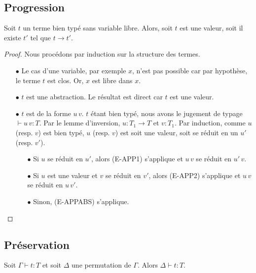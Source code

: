 \subsection*{Progression}

\begin{theorem} 
  \label{thm:simply-typed-lambda-calculus-progression}
  Soit $t$ un terme bien typé sans variable libre. Alors, soit $t$ est une
  valeur, soit il existe $t'$ tel que $t \rightarrow t'$.
\end{theorem}

\begin{proof}
  \label{proof:simply-typed-lambda-calculus-progression}
  Nous procédons par induction sur la structure des termes.
  \begin{itemize}
    \item[$\bullet$] Le cas d'une variable, par exemple $x$, n'est pas possible car par
      hypothèse, le terme $t$ est clos. Or, $x$ est libre dans $x$.
    \item[$\bullet$] $t$ est une abstraction. Le résultat est direct car $t$ est une valeur.
    \item[$\bullet$] $t$ est de la forme $u \, v$. $t$ étant
      bien typé, nous avons le jugement de typage $\vdash u \, v : T$. Par le lemme
      d'inversion, $u : T_{1} \rightarrow T$ et $v : T_{1}$. Par induction,
      comme $u$ (resp. $v$) est bien typé, $u$ (resp. $v$) est soit une valeur,
      soit se réduit en un $u'$ (resp. $v'$).
      \begin{itemize}
        \item[$\bullet$] Si $u$ se réduit en $u'$, alors (E-APP1) s'applique et $u \, v$
          se réduit en $u' \, v$.
        \item[$\bullet$] Si $u$ est une valeur et $v$ se réduit en $v'$, alors (E-APP2)
          s'applique et $u \, v$ se réduit en $u \, v'$.
        \item[$\bullet$] Sinon, (E-APPABS) s'applique.
      \end{itemize}
  \end{itemize}
\end{proof}

\subsection*{Préservation}

\begin{lemma} [de permutation]
  \label{thm:simply-typed-lambda-calculus-permutation}
  Soit $\Gamma \vdash t : T$ et soit $\Delta$ une permutation de $\Gamma$. Alors
  $\Delta \vdash t : T$.
\end{lemma}


